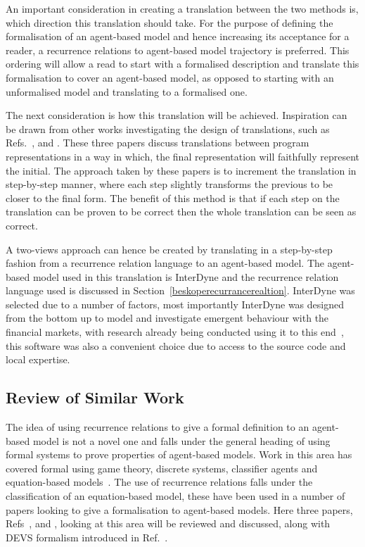 \documentclass{article}
\begin{document}
An important consideration in creating a translation between the two methods is, which direction this translation should take. For the purpose of defining the formalisation of an agent-based model and hence increasing its acceptance for a reader, a recurrence relations to agent-based model trajectory is preferred. This ordering will allow a read to start with a formalised description and translate this formalisation to cover an agent-based model, as opposed to starting with an unformalised model and translating to a formalised one.     

The next consideration is how this translation will be achieved. Inspiration can be drawn from other works investigating the design of translations, such as Refs.~\cite{clovertrans},  \cite{transproggotmod} and  \cite{stepcorentconv}. These three papers discuss translations between program representations in a way in which, the final representation will faithfully represent the initial. The approach taken by these papers is to increment the translation in step-by-step manner, where each step slightly transforms the previous to be closer to the final form. The benefit of this method is that if each step on the translation can be proven to be correct then the whole translation can be seen as correct. 

A two-views approach can hence be created by translating in a step-by-step fashion from a recurrence relation language to an agent-based model. The agent-based model used in this translation is InterDyne and the recurrence relation language used is discussed in Section~\ref{beskoperecurrancerealtion}. InterDyne was selected due to a number of factors, most importantly InterDyne was designed from the bottom up to model and investigate emergent behaviour with the financial markets, with research already being conducted using it to this end~\cite{DynamicCoupling_Chris}, this software was also a convenient choice due to access to the source code and local expertise.

\subsection{Review of Similar Work}
The idea of using recurrence relations to give a formal definition to an agent-based model is not a novel one and falls under the general heading of using formal systems to prove properties of agent-based models. Work in this area has covered formal using game theory, discrete systems, classifier agents and equation-based models~\cite{taabm}. The use of recurrence relations falls under the classification of an equation-based model, these have been used in a number of papers looking to give a formalisation to agent-based models. Here three papers, Refs~\cite{ebmabmi}, \cite{econmistsnoabm} and \cite{abmtsd}, looking at this area will be reviewed and discussed, along with DEVS formalism introduced in Ref.~\cite{introdevs}.
\end{document}
